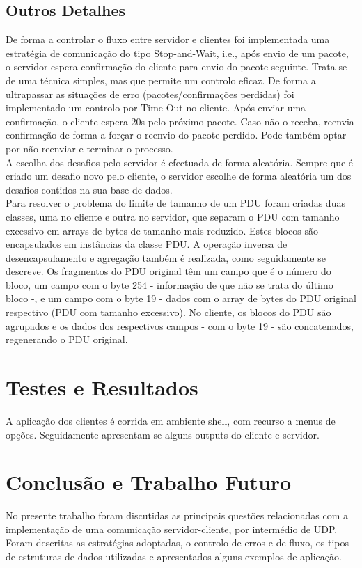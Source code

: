 \documentclass{llncs}
\begin{document}
\subsection{Outros Detalhes}
De forma a controlar o fluxo entre servidor e clientes foi implementada uma 
estratégia de comunicação do tipo Stop-and-Wait, i.e., após envio de um pacote, 
o servidor espera confirmação do cliente para envio do pacote seguinte. Trata-se 
de uma técnica simples, mas que permite um controlo eficaz. De forma a ultrapassar 
as situações de erro (pacotes/confirmações perdidas) foi implementado um controlo 
por Time-Out no cliente. Após enviar uma confirmação, o cliente espera 20s pelo 
próximo pacote. Caso não o receba, reenvia confirmação de forma a forçar o reenvio 
do pacote perdido. Pode também optar por não reenviar e terminar o processo.\\

A escolha dos desafios pelo servidor é efectuada de forma aleatória. 
Sempre que é criado um desafio novo pelo cliente, o servidor escolhe de forma aleatória 
um dos desafios contidos na sua base de dados.\\

Para resolver o problema do limite de tamanho de um PDU foram criadas duas classes, uma no 
cliente e outra no servidor, que separam o PDU com tamanho excessivo em arrays de bytes de 
tamanho mais reduzido. Estes blocos são encapsulados em instâncias da classe PDU. 
A operação inversa de desencapsulamento e agregação também é realizada, como seguidamente se descreve. 
Os fragmentos do PDU original têm um campo que é o número do bloco, um campo com o byte 254 - informação 
de que não se trata do último bloco -, e um campo com o byte 19 - dados com o array 
de bytes do PDU original respectivo (PDU com tamanho excessivo). 
No cliente, os blocos do PDU são agrupados e os dados dos respectivos campos - com o byte 
19 - são concatenados, regenerando o PDU original.

\section{Testes e Resultados}
A aplicação dos clientes é corrida em ambiente shell, com recurso a menus de opções. 
Seguidamente apresentam-se alguns outputs do cliente e servidor.



\section{Conclusão e Trabalho Futuro}
No presente trabalho foram discutidas as principais questões relacionadas com a 
implementação de uma comunicação servidor-cliente, por intermédio de UDP. 
Foram descritas as estratégias adoptadas, o controlo de erros e de fluxo, 
os tipos de estruturas de dados utilizadas e apresentados alguns exemplos de aplicação.\\
\end{document}
